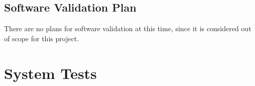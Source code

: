 \documentclass[12pt, titlepage]{article}
\begin{document}



\subsection{Software Validation Plan}

There are no plans for software validation at this time, since it is considered
out of scope for this project.






\section{System Tests}

\end{document}
